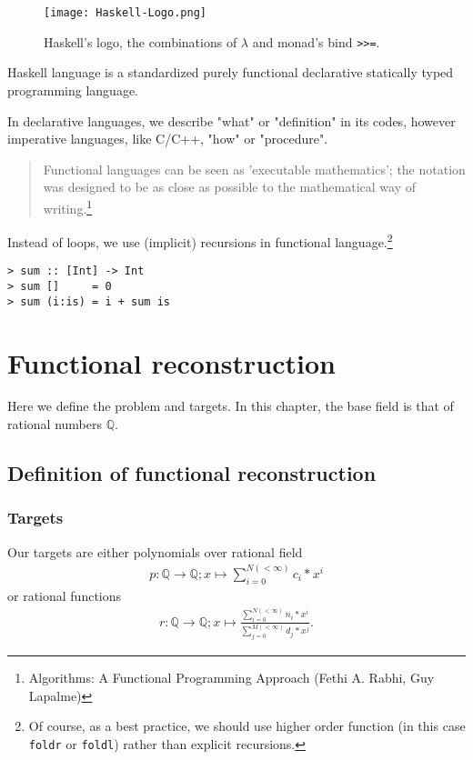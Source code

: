 \documentclass[11pt]{book}
\begin{document}
\begin{figure}[h]
\begin{center}
\texttt{[image: Haskell-Logo.png]}
\caption{Haskell's logo, the combinations of $\lambda$ and monad's bind \texttt{>>=}.}
\label{Haskell-Logo}
\end{center}
\end{figure}

Haskell language is a standardized purely functional declarative statically typed programming language.

In declarative languages, we describe "what" or "definition" in its codes, however imperative languages, like C/C++, "how" or "procedure".
\begin{quotation}
Functional languages can be seen as 'executable mathematics'; the notation was designed to be as close as possible to the mathematical way of writing.\footnote{
Algorithms: A Functional Programming Approach (Fethi A. Rabhi, Guy Lapalme)
}
\end{quotation}
Instead of loops, we use (implicit) recursions in functional language.\footnote{Of course, as a best practice, we should use higher order function (in this case \texttt{foldr} or \texttt{foldl}) rather than explicit recursions.
}
\begin{verbatim}
> sum :: [Int] -> Int
> sum []     = 0
> sum (i:is) = i + sum is
\end{verbatim}


\chapter{Functional reconstruction}
Here we define the problem and targets.
In this chapter, the base field is that of rational numbers $\mathbb{Q}$.

\section{Definition of functional reconstruction}
\subsection{Targets}
Our targets are either polynomials over rational field
\begin{eqnarray}
p : \mathbb{Q} \to \mathbb{Q}; x \mapsto \sum_{i=0}^{N (<\infty)} c_i * x^i
\end{eqnarray}
or rational functions
\begin{eqnarray}
r : \mathbb{Q} \to \mathbb{Q}; x \mapsto \frac{\sum_{i=0}^{N (<\infty)} n_i * x^i}{\sum_{j=0}^{M (<\infty)} d_j * x^j}.
\end{eqnarray}
\end{document}
